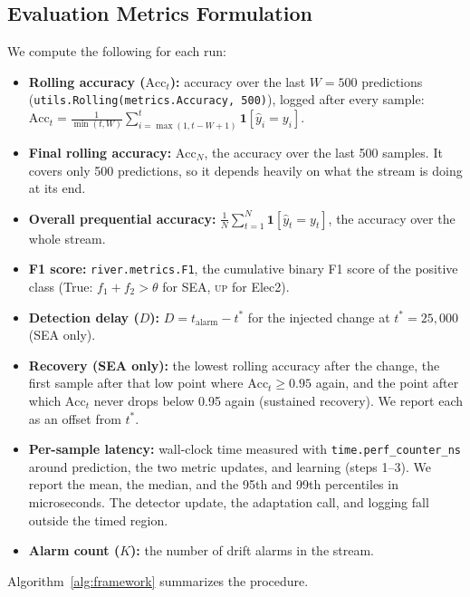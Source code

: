 \documentclass[conference]{IEEEtran}
\begin{document}
\subsection{Evaluation Metrics Formulation}
\label{sec:metrics}
We compute the following for each run:
\begin{itemize}
    \item \textbf{Rolling accuracy ($\text{Acc}_t$):} accuracy over the last $W = 500$ predictions (\texttt{utils.Rolling(metrics.Accuracy, 500)}), logged after every sample: $\text{Acc}_t = \frac{1}{\min(t, W)} \sum_{i = \max(1, t - W + 1)}^{t} \mathbf{1}[\hat{y}_i = y_i]$.
    \item \textbf{Final rolling accuracy:} $\text{Acc}_N$, the accuracy over the last 500 samples. It covers only 500 predictions, so it depends heavily on what the stream is doing at its end.
    \item \textbf{Overall prequential accuracy:} $\frac{1}{N}\sum_{t=1}^{N} \mathbf{1}[\hat{y}_t = y_t]$, the accuracy over the whole stream.
    \item \textbf{F1 score:} \texttt{river.metrics.F1}, the cumulative binary F1 score of the positive class (True: $f_1 + f_2 > \theta$ for SEA, \textsc{up} for Elec2).
    \item \textbf{Detection delay ($D$):} $D = t_{\text{alarm}} - t^*$ for the injected change at $t^* = 25{,}000$ (SEA only).
    \item \textbf{Recovery (SEA only):} the lowest rolling accuracy after the change, the first sample after that low point where $\text{Acc}_t \ge 0.95$ again, and the point after which $\text{Acc}_t$ never drops below 0.95 again (sustained recovery). We report each as an offset from $t^*$.
    \item \textbf{Per-sample latency:} wall-clock time measured with \texttt{time.perf\_counter\_ns} around prediction, the two metric updates, and learning (steps 1--3). We report the mean, the median, and the 95th and 99th percentiles in microseconds. The detector update, the adaptation call, and logging fall outside the timed region.
    \item \textbf{Alarm count ($K$):} the number of drift alarms in the stream.
\end{itemize}
Algorithm~\ref{alg:framework} summarizes the procedure.
\end{document}
